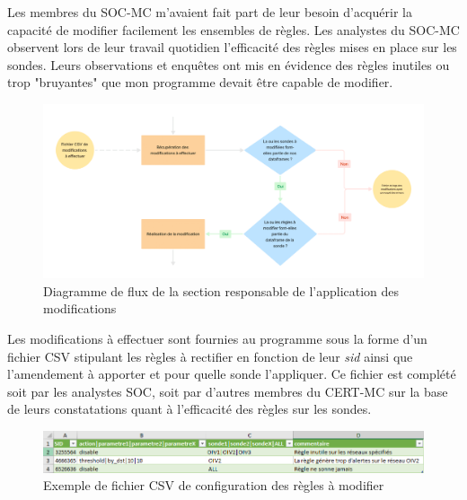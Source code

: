 \vspace{1em}

Les membres du SOC-MC m'avaient fait part de leur besoin d'acquérir la capacité de modifier facilement les ensembles de règles. Les analystes du SOC-MC observent lors de leur travail quotidien l'efficacité des règles mises en place sur les sondes. Leurs observations et enquêtes ont mis en évidence des règles inutiles ou trop "bruyantes" que mon programme devait être capable de modifier.

\begin{figure}[h]%
    \center%
    \includegraphics[width=1\textwidth]{assets/diagrameFlux3-4.png}
    \caption[Diagramme de flux de la section responsable de l'application des modifications]{Diagramme de flux de la section responsable de l'application des modifications}\label{fig:diagrameFlux3-4}
\end{figure}

\vspace{1em}

Les modifications à effectuer sont fournies au programme sous la forme d'un fichier CSV stipulant les règles à rectifier en fonction de leur \textit{sid} ainsi que l'amendement à apporter et pour quelle sonde l'appliquer. Ce fichier est complété soit par les analystes SOC, soit par d'autres membres du CERT-MC sur la base de leurs constatations quant à l'efficacité des règles sur les sondes.\\

\vspace{1em}

\begin{figure}[h]%
    \center%
    \includegraphics[width=1\textwidth]{assets/CaptureCSV.png}
    \caption[Exemple de fichier CSV de configuration des règles à modifier]{Exemple de fichier CSV de configuration des règles à modifier}\label{fig:CaptureCSV}
\end{figure}

